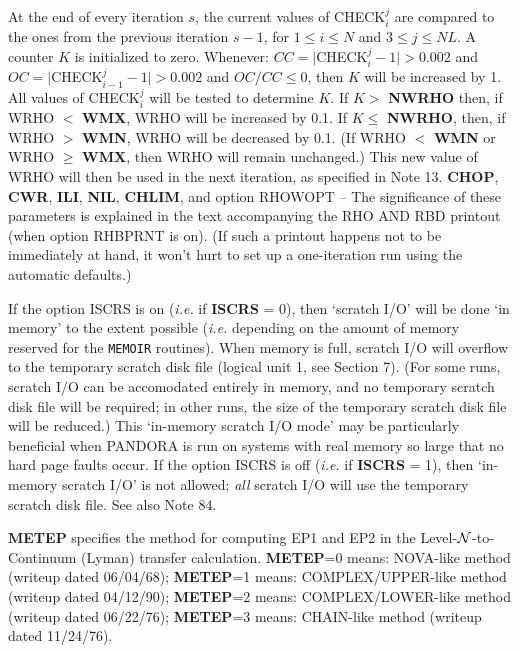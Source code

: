 At the end of every iteration $s$, the current values of
CHECK$_i^j$ are compared to the ones from the previous iteration $s-1$,
for $1 \leq i \leq N$ and $3 \leq j \leq NL$. \break A counter $K$ is
initialized to zero.
Whenever: $CC = |$CHECK$_i^j -1| > 0.002$ and $OC = |$CHECK$_{i-1}^j
-1| > 0.002$ and $OC / CC \leq 0$, then $K$ will be increased by 1.
All values of CHECK$^j_i$ will be tested to determine $K$.
If $K > $ {\bf NWRHO} then,
if WRHO $<$ {\bf WMX}, WRHO will be increased by 0.1. 
If $K \leq $ {\bf NWRHO}, then,
if WRHO $>$ {\bf WMN}, WRHO will be decreased by 0.1. (If WRHO $<$ {\bf WMN} or
WRHO $\geq$ {\bf WMX}, then WRHO will remain unchanged.) This new value of WRHO
will then be used in the next iteration, as specified in Note 13.
\spice \noindent
{\bf CHOP}, {\bf CWR}, {\bf ILI}, {\bf NIL}, {\bf CHLIM}, and option RHOWOPT -- \np
The significance of these parameters is explained in the text accompanying
the RHO AND RBD printout (when option RHBPRNT is on). (If such a printout
happens not to be immediately at hand, it won't hurt to set up a one-iteration
run using the automatic defaults.)
\blankline
\blankline
\centerline{}
\space \noindent
If the option ISCRS is on ({\it i.e.} if {\bf ISCRS} = 0),
then `scratch I/O' will be done `in memory' to the
extent possible ({\it i.e.} depending on the amount of memory reserved for the
{\tt MEMOIR} routines). When memory is full, scratch I/O will overflow to the
temporary scratch disk file (logical unit 1, see Section 7).
(For some runs, scratch I/O can be accomodated entirely in memory,
and no temporary scratch disk file will be required; in other runs,
the size of the temporary scratch disk file will be reduced.) 
This `in-memory scratch I/O mode' may be particularly
beneficial when PANDORA is run on systems with real memory so large that
no hard page faults occur. \np
If the option ISCRS is off ({\it i.e.} if {\bf ISCRS} = 1),
then `in-memory scratch I/O' is not allowed; 
{\it all} scratch I/O will use the temporary scratch disk file. \np
See also Note 84.
\ej
\centerline{}
\space \noindent
{\bf METEP} specifies the method for computing EP1 and EP2 in the
Level-${\cal N}$-to-Continuum (Lyman) transfer calculation. \np
{\bf METEP}=0 means: NOVA-like method (writeup dated 06/04/68); \np
{\bf METEP}=1 means: COMPLEX/UPPER-like method (writeup dated 04/12/90); \np
{\bf METEP}=2 means: COMPLEX/LOWER-like method (writeup dated 06/22/76); \np
{\bf METEP}=3 means: CHAIN-like method (writeup dated 11/24/76). \np
